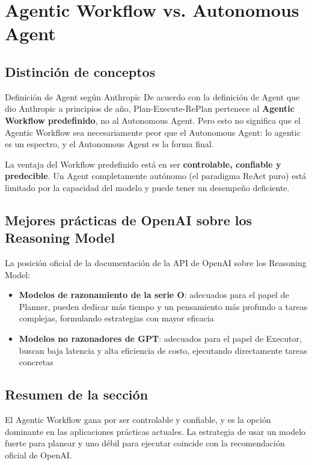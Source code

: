 \section{Agentic Workflow vs. Autonomous Agent}

\subsection{Distinción de conceptos}

\begin{knowledgebox}{Definición de Agent según Anthropic}
De acuerdo con la definición de Agent que dio Anthropic a principios de año, Plan-Execute-RePlan pertenece al \textbf{Agentic Workflow predefinido}, no al Autonomous Agent. Pero esto no significa que el Agentic Workflow sea necesariamente peor que el Autonomous Agent: lo agentic es un espectro, y el Autonomous Agent es la forma final.
\end{knowledgebox}

La ventaja del Workflow predefinido está en ser \textbf{controlable, confiable y predecible}. Un Agent completamente autónomo (el paradigma ReAct puro) está limitado por la capacidad del modelo y puede tener un desempeño deficiente.

\subsection{Mejores prácticas de OpenAI sobre los Reasoning Model}

La posición oficial de la documentación de la API de OpenAI sobre los Reasoning Model:
\begin{itemize}
    \item \textbf{Modelos de razonamiento de la serie O}: adecuados para el papel de Planner, pueden dedicar más tiempo y un pensamiento más profundo a tareas complejas, formulando estrategias con mayor eficacia
    \item \textbf{Modelos no razonadores de GPT}: adecuados para el papel de Executor, buscan baja latencia y alta eficiencia de costo, ejecutando directamente tareas concretas
\end{itemize}

\subsection{Resumen de la sección}

El Agentic Workflow gana por ser controlable y confiable, y es la opción dominante en las aplicaciones prácticas actuales. La estrategia de usar un modelo fuerte para planear y uno débil para ejecutar coincide con la recomendación oficial de OpenAI.

